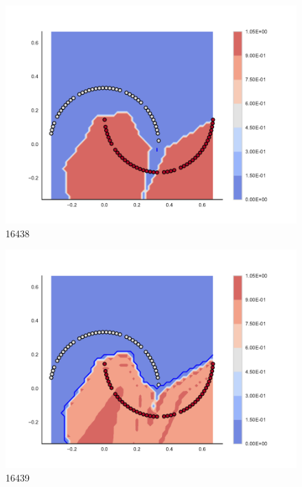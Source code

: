 \begin{subfigure}[b]{0.09\textwidth}
    \includegraphics[clip, trim=2.35cm 1.75cm 4.5cm 0cm,width=\textwidth]{img/convergence/16438.pdf}
    \caption{16438}
    \label{fig:convergence_16438}
\end{subfigure}
%
\begin{subfigure}[b]{0.09\textwidth}
    \includegraphics[clip, trim=2.35cm 1.75cm 4.5cm 0cm,width=\textwidth]{img/convergence/16439.pdf}
    \caption{16439}
    \label{fig:convergence_16439}
\end{subfigure}
%
